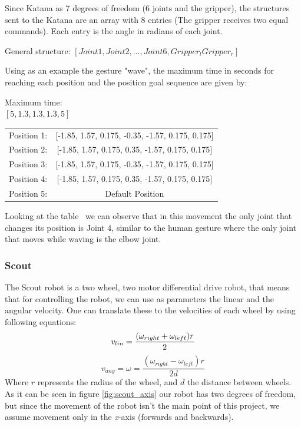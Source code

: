 Since Katana as 7 degrees of freedom (6 joints and the gripper), the structures sent to the Katana are an array with 8 entries (The gripper receives two equal commands). Each entry is the angle in radians of each joint.

\begin{center}
General structure:
$\left[ Joint1, Joint2, ... , Joint6, Gripper_l Gripper_r\right]$
\end{center}

Using as an example the gesture "wave", the maximum time in seconds for reaching each position and the position goal sequence are given by:

\begin{center}
Maximum time: \\
$\left[5, 1.3, 1.3, 1.3, 5\right]$
\end{center}

\begin{table}[!ht]
\centering
\begin{tabular}{lc}
Position 1: & {[}-1.85, 1.57, 0.175, -0.35, -1.57, 0.175, 0.175{]} \\
Position 2: & {[}-1.85, 1.57, 0.175,  0.35, -1.57, 0.175, 0.175{]}  \\
Position 3: & {[}-1.85, 1.57, 0.175, -0.35, -1.57, 0.175, 0.175{]} \\
Position 4: & {[}-1.85, 1.57, 0.175,  0.35, -1.57, 0.175, 0.175{]}  \\
Position 5: & Default Position                                    
\end{tabular}
\end{table}

Looking at the table~ we can observe that in this movement the only joint that changes its position is Joint 4, similar to the human gesture where the only joint that moves while waving is the elbow joint.

\subsubsection{Scout}
The Scout robot is a two wheel, two motor differential drive robot, that means that for controlling the robot, we can use as parameters the linear and the angular velocity. One can translate these to the velocities of each wheel by using following equations:
\begin{equation}
v_{lin} = \frac{(\omega_{right}+\omega_{left})r}{2} \\
\end{equation}
\begin{equation}
v_{ang} = \omega = \frac{(\omega_{right}-\omega_{left})r}{2d}
\end{equation}
Where $r$ represents the radius of the wheel, and $d$ the distance between wheels.
As it can be seen in figure \ref{fig:scout_axis} our robot has two degrees of freedom, but since the movement of the robot isn't the main point of this project, we assume movement only in the \textit{x}-axis (forwards and backwards).

